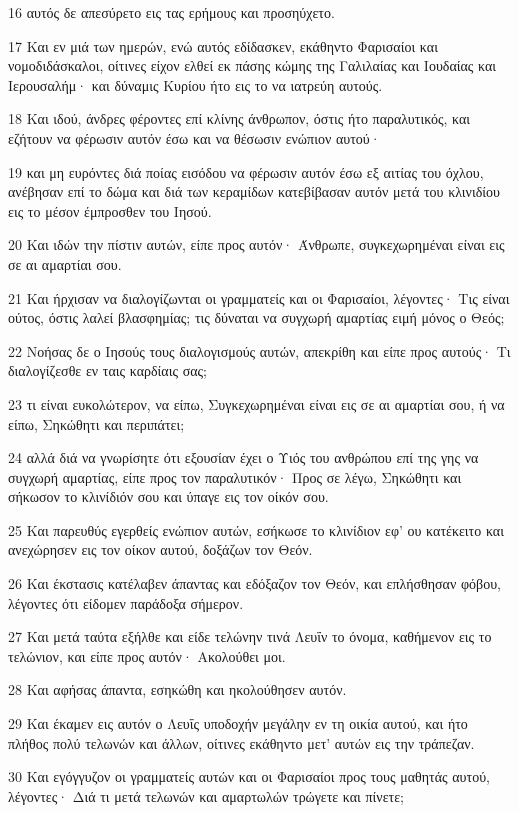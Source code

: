\par 16 αυτός δε απεσύρετο εις τας ερήμους και προσηύχετο.
\par 17 Και εν μιά των ημερών, ενώ αυτός εδίδασκεν, εκάθηντο Φαρισαίοι και νομοδιδάσκαλοι, οίτινες είχον ελθεί εκ πάσης κώμης της Γαλιλαίας και Ιουδαίας και Ιερουσαλήμ· και δύναμις Κυρίου ήτο εις το να ιατρεύη αυτούς.
\par 18 Και ιδού, άνδρες φέροντες επί κλίνης άνθρωπον, όστις ήτο παραλυτικός, και εζήτουν να φέρωσιν αυτόν έσω και να θέσωσιν ενώπιον αυτού·
\par 19 και μη ευρόντες διά ποίας εισόδου να φέρωσιν αυτόν έσω εξ αιτίας του όχλου, ανέβησαν επί το δώμα και διά των κεραμίδων κατεβίβασαν αυτόν μετά του κλινιδίου εις το μέσον έμπροσθεν του Ιησού.
\par 20 Και ιδών την πίστιν αυτών, είπε προς αυτόν· Άνθρωπε, συγκεχωρημέναι είναι εις σε αι αμαρτίαι σου.
\par 21 Και ήρχισαν να διαλογίζωνται οι γραμματείς και οι Φαρισαίοι, λέγοντες· Τις είναι ούτος, όστις λαλεί βλασφημίας; τις δύναται να συγχωρή αμαρτίας ειμή μόνος ο Θεός;
\par 22 Νοήσας δε ο Ιησούς τους διαλογισμούς αυτών, απεκρίθη και είπε προς αυτούς· Τι διαλογίζεσθε εν ταις καρδίαις σας;
\par 23 τι είναι ευκολώτερον, να είπω, Συγκεχωρημέναι είναι εις σε αι αμαρτίαι σου, ή να είπω, Σηκώθητι και περιπάτει;
\par 24 αλλά διά να γνωρίσητε ότι εξουσίαν έχει ο Υιός του ανθρώπου επί της γης να συγχωρή αμαρτίας, είπε προς τον παραλυτικόν· Προς σε λέγω, Σηκώθητι και σήκωσον το κλινίδιόν σου και ύπαγε εις τον οίκόν σου.
\par 25 Και παρευθύς εγερθείς ενώπιον αυτών, εσήκωσε το κλινίδιον εφ' ου κατέκειτο και ανεχώρησεν εις τον οίκον αυτού, δοξάζων τον Θεόν.
\par 26 Και έκστασις κατέλαβεν άπαντας και εδόξαζον τον Θεόν, και επλήσθησαν φόβου, λέγοντες ότι είδομεν παράδοξα σήμερον.
\par 27 Και μετά ταύτα εξήλθε και είδε τελώνην τινά Λευΐν το όνομα, καθήμενον εις το τελώνιον, και είπε προς αυτόν· Ακολούθει μοι.
\par 28 Και αφήσας άπαντα, εσηκώθη και ηκολούθησεν αυτόν.
\par 29 Και έκαμεν εις αυτόν ο Λευΐς υποδοχήν μεγάλην εν τη οικία αυτού, και ήτο πλήθος πολύ τελωνών και άλλων, οίτινες εκάθηντο μετ' αυτών εις την τράπεζαν.
\par 30 Και εγόγγυζον οι γραμματείς αυτών και οι Φαρισαίοι προς τους μαθητάς αυτού, λέγοντες· Διά τι μετά τελωνών και αμαρτωλών τρώγετε και πίνετε;
